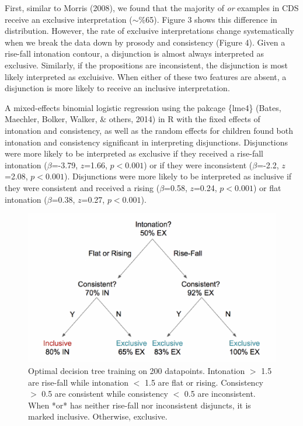 \documentclass[10pt, letterpaper]{article}
\newenvironment{CodeChunk}{}{}
\begin{document}
First, similar to Morris (2008), we found that the majority of \emph{or}
examples in CDS receive an exclusive interpretation (\(\sim\)\%65).
Figure 3 shows this difference in distribution. However, the rate of
exclusive interpretations change systematically when we break the data
down by prosody and consistency (Figure 4). Given a rise-fall intonation
contour, a disjunction is almost always interpreted as exclusive.
Similarly, if the propositions are inconsistent, the disjunction is most
likely interpreted as excluisive. When either of these two features are
absent, a disjunction is more likely to receive an inclusive
interpretation.

A mixed-effects binomial logistic regression using the pakcage \{lme4\}
(Bates, Maechler, Bolker, Walker, \& others, 2014) in R with the fixed
effects of intonation and consistency, as well as the random effects for
children found both intonation and consistency significant in
interpreting disjunctions. Disjunctions were more likely to be
interpreted as exclusive if they received a rise-fall intonation
(\(\beta\)=-3.79, \(z\)=1.66, \(p < 0.001\)) or if they were
inconsistent (\(\beta\)=-2.2, \(z\)=2.08, \(p < 0.001\)). Disjunctions
were more likely to be interpreted as inclusive if they were consistent
and received a rising (\(\beta\)=0.58, \(z\)=0.24, \(p < 0.001\)) or
flat intonation (\(\beta\)=0.38, \(z\)=0.27, \(p < 0.001\)).

\begin{CodeChunk}
\begin{figure}[H]

\includegraphics{figs/treeDiagram-1} \hfill{}

\caption[Optimal decision tree training on 200 datapoints]{Optimal decision tree training on 200 datapoints. Intonation $>$ 1.5 are rise-fall while intonation $<$ 1.5 are flat or rising. Consistency $>$ 0.5 are consistent while consistency $<$ 0.5 are  inconsistent. When *or* has neither rise-fall nor inconsistent disjuncts, it is marked inclusive. Otherwise, exclusive.}\label{fig:treeDiagram}
\end{figure}
\end{CodeChunk}
\end{document}
